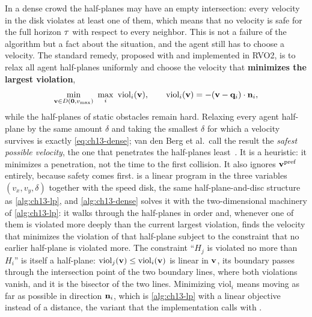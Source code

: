 In a dense crowd the half-planes may have an empty intersection: every
velocity in the disk violates at least one of them, which means that no
velocity is safe for the full horizon $\tau$ with respect to every
neighbor. This is not a failure of the algorithm but a fact about the
situation, and the agent still has to choose a velocity. The standard remedy,
proposed with \orca and implemented in RVO2, is to relax all agent
half-planes uniformly and choose the velocity that \textbf{minimizes the
largest violation},
\begin{equation}
  \min_{\mathbf{v} \in D(\mathbf{0},v_{\max})}\ \max_{i}\ \mathrm{viol}_i(\mathbf{v}),
  \qquad \mathrm{viol}_i(\mathbf{v}) = -(\mathbf{v} - \mathbf{q}_i)\cdot\mathbf{n}_i,
  \label{eq:ch13-dense}
\end{equation}
while the half-planes of static obstacles remain hard. Relaxing every agent
half-plane by the same amount $\delta$ and taking the smallest $\delta$ for
which a velocity survives is exactly \cref{eq:ch13-dense}; van den Berg et
al.\ call the result the \emph{safest possible velocity}, the one that
penetrates the half-planes least~\cite{vandenberg2011orca}. It is a
heuristic: it minimizes a penetration, not the time to the first collision.
It also ignores $\mathbf{v}^{\mathrm{pref}}$ entirely, because safety comes first.
 is a linear program in the three variables
$(v_x, v_y, \delta)$ together with the speed disk, the same
half-plane-and-disc structure as \cref{alg:ch13-lp},
and \cref{alg:ch13-dense} solves it with the two-dimensional machinery of
\cref{alg:ch13-lp}: it walks through the half-planes in order and, whenever
one of them is violated more deeply than the current largest violation,
finds the velocity that minimizes the violation of that half-plane subject
to the constraint that no earlier half-plane is violated more. The
constraint ``$H_j$ is violated no more than $H_i$'' is itself a half-plane:
$\mathrm{viol}_j(\mathbf{v}) \le \mathrm{viol}_i(\mathbf{v})$ is linear in $\mathbf{v}$, its
boundary passes through the intersection point of the two boundary lines,
where both violations vanish, and it is the bisector of the two lines.
Minimizing $\mathrm{viol}_i$ means moving as far as possible in direction
$\mathbf{n}_i$, which is \cref{alg:ch13-lp} with a linear objective instead of
a distance, the variant that the implementation calls with
.


